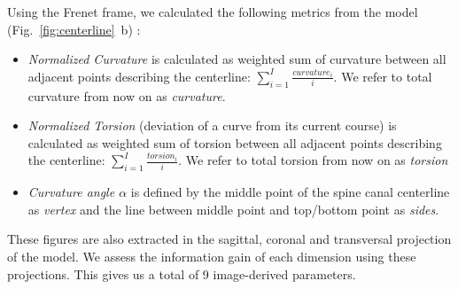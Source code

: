 \documentclass[a4paper,twoside]{style/article}
\newcommand{\com}[1]{\textcolor{orange}{\uline{#1}}}
\begin{document}
Using the Frenet frame, we calculated the following metrics from the model (Fig.~\ref{fig:centerline}~b) \cite{Frenet}:
\begin{itemize}
	\item \emph{Normalized Curvature} is calculated as weighted sum of curvature between all adjacent points describing the centerline: $\sum_{i=1}^I \frac{curvature_i}{i}$. We refer to total curvature from now on as \emph{curvature}.
	\item \emph{Normalized Torsion} (deviation of a curve from its current course) is calculated as weighted sum of torsion between all adjacent points describing the centerline: $\sum_{i=1}^I \frac{torsion_i}{i}$. We refer to total torsion from now on as \emph{torsion}
	\item \emph{Curvature angle $\alpha$} is defined by the middle point of the spine canal centerline as \emph{vertex} and the line between middle point and top/bottom point as \emph{sides}.
\end{itemize}
These figures are also extracted in the sagittal, coronal and transversal projection of the model.
We assess the information gain of each dimension using these projections.
This gives us a total of 9 image-derived parameters.


\end{document}
